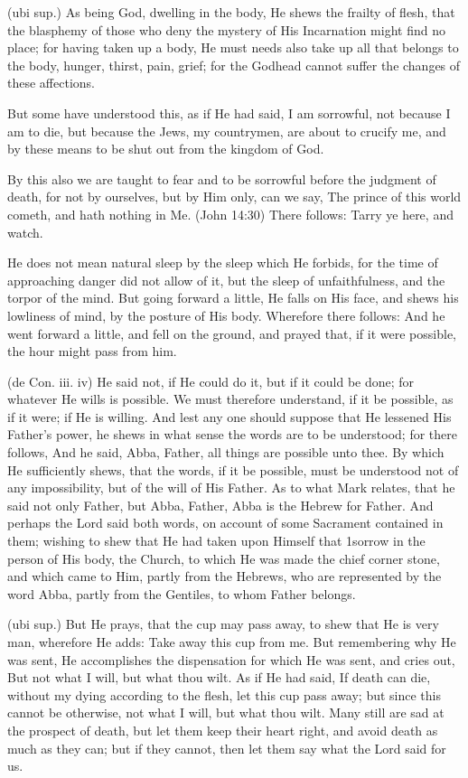  (ubi sup.) As being God, dwelling in the body, He shews the frailty of flesh, that the blasphemy of those who deny the mystery of His Incarnation might find no place; for having taken up a body, He must needs also take up all that belongs to the body, hunger, thirst, pain, grief; for the Godhead cannot suffer the changes of these affections.

 But some have understood this, as if He had said, I am sorrowful, not because I am to die, but because the Jews, my countrymen, are about to crucify me, and by these means to be shut out from the kingdom of God.

 By this also we are taught to fear and to be sorrowful before the judgment of death, for not by ourselves, but by Him only, can we say, The prince of this world cometh, and hath nothing in Me. (John 14:30) There follows: Tarry ye here, and watch.

 He does not mean natural sleep by the sleep which He forbids, for the time of approaching danger did not allow of it, but the sleep of unfaithfulness, and the torpor of the mind. But going forward a little, He falls on His face, and shews his lowliness of mind, by the posture of His body. Wherefore there follows: And he went forward a little, and fell on the ground, and prayed that, if it were possible, the hour might pass from him.

 (de Con. iii. iv) He said not, if He could do it, but if it could be done; for whatever He wills is possible. We must therefore understand, if it be possible, as if it were; if He is willing. And lest any one should suppose that He lessened His Father’s power, he shews in what sense the words are to be understood; for there follows, And he said, Abba, Father, all things are possible unto thee. By which He sufficiently shews, that the words, if it be possible, must be understood not of any impossibility, but of the will of His Father. As to what Mark relates, that he said not only Father, but Abba, Father, Abba is the Hebrew for Father. And perhaps the Lord said both words, on account of some Sacrament contained in them; wishing to shew that He had taken upon Himself that 1sorrow in the person of His body, the Church, to which He was made the chief corner stone, and which came to Him, partly from the Hebrews, who are represented by the word Abba, partly from the Gentiles, to whom Father belongs.

 (ubi sup.) But He prays, that the cup may pass away, to shew that He is very man, wherefore He adds: Take away this cup from me. But remembering why He was sent, He accomplishes the dispensation for which He was sent, and cries out, But not what I will, but what thou wilt. As if He had said, If death can die, without my dying according to the flesh, let this cup pass away; but since this cannot be otherwise, not what I will, but what thou wilt. Many still are sad at the prospect of death, but let them keep their heart right, and avoid death as much as they can; but if they cannot, then let them say what the Lord said for us.


